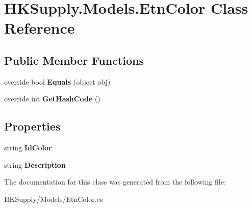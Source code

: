 \hypertarget{class_h_k_supply_1_1_models_1_1_etn_color}{}\section{H\+K\+Supply.\+Models.\+Etn\+Color Class Reference}
\label{class_h_k_supply_1_1_models_1_1_etn_color}
\subsection*{Public Member Functions}
\begin{DoxyCompactItemize}
\item 
\mbox{\label{class_h_k_supply_1_1_models_1_1_etn_color_a1df2c44ca65462bf69c87be26f79d095}} 
override bool {\bfseries Equals} (object obj)
\item 
\mbox{\label{class_h_k_supply_1_1_models_1_1_etn_color_ae5973bfd9f62e66d2827800463c54035}} 
override int {\bfseries Get\+Hash\+Code} ()
\end{DoxyCompactItemize}
\subsection*{Properties}
\begin{DoxyCompactItemize}
\item 
\mbox{\label{class_h_k_supply_1_1_models_1_1_etn_color_ab27b9c6e482fae6256f5d9883014479f}} 
string {\bfseries Id\+Color}
\item 
\mbox{\label{class_h_k_supply_1_1_models_1_1_etn_color_ac9a91a06137983b989829dc941fe601b}} 
string {\bfseries Description}
\end{DoxyCompactItemize}


The documentation for this class was generated from the following file\+:\begin{DoxyCompactItemize}
\item 
H\+K\+Supply/\+Models/Etn\+Color.\+cs\end{DoxyCompactItemize}
